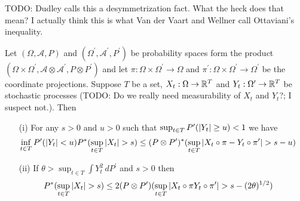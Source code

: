 TODO: Dudley calls this a desymmetrization fact.  What the heck does that mean?  I actually think this is what Van der Vaart and Wellner call Ottaviani's inequality.  
\begin{lem}Let $(\Omega, \mathcal{A}, P)$ and $(\Omega^\prime, \mathcal{A}^\prime, P^\prime)$ be probability spaces form the product $(\Omega \times \Omega^\prime, \mathcal{A} \otimes  \mathcal{A}^\prime, P \otimes P^\prime)$ and let $\pi : \Omega \times \Omega^\prime \to \Omega$ and $\pi^\prime : \Omega \times \Omega^\prime \to \Omega^\prime$ be the coordinate projections.  Suppose $T$ be a set, $X_t : \Omega \to \mathbb{R}^T$ and $Y_t : \Omega^\prime \to \mathbb{R}^T$ be stochastic processes (TODO: Do we really need measurability of $X_t$ and $Y_t$?; I suspect not.).   Then
\begin{itemize}
\item[(i)] For any $s>0$ and $u > 0$ such that $\sup_{t \in T} P^\prime( \left \vert Y_t \right \vert \geq u )< 1$ we have
\begin{align*}
\inf_{t \in T}  P^\prime( \left \vert Y_t \right \vert < u ) P^*(\sup_{t \in T} \left \vert X_t \right \vert > s) &\leq (P \otimes P^\prime)^* (\sup_{t \in T} \left \vert X_t \circ \pi  - Y_t \circ \pi^\prime \right \vert > s - u)
\end{align*}
\item[(ii)] If $\theta > \sup_{t \in T} \int Y_t^2 \, dP^\prime$ and $s>0$ then
\begin{align*}
P^*(\sup_{t \in T} \left \vert X_t \right \vert > s) &\leq 2 (P \otimes P^\prime) ( \sup_{t \in T} \left \vert X_t \circ \pi  Y_t \circ \pi^\prime \right \vert > s - (2\theta)^{1/2})
\end{align*}
\end{itemize}
\end{lem}
